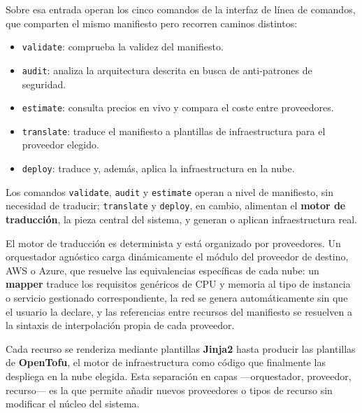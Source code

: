 Sobre esa entrada operan los cinco comandos de la interfaz de línea de comandos, que comparten el
mismo manifiesto pero recorren caminos distintos:

\begin{itemize}
    \item \texttt{validate}: comprueba la validez del manifiesto.
    \item \texttt{audit}: analiza la arquitectura descrita en busca de anti-patrones de seguridad.
    \item \texttt{estimate}: consulta precios en vivo y compara el coste entre proveedores.
    \item \texttt{translate}: traduce el manifiesto a plantillas de infraestructura para el proveedor elegido.
    \item \texttt{deploy}: traduce y, además, aplica la infraestructura en la nube.
\end{itemize}

Los comandos \texttt{validate}, \texttt{audit} y \texttt{estimate} operan a nivel de manifiesto,
sin necesidad de traducir; \texttt{translate} y \texttt{deploy}, en cambio, alimentan el
\textbf{motor de traducción}, la pieza central del sistema, y generan o aplican infraestructura real.

El motor de traducción es determinista y está organizado por proveedores. Un orquestador agnóstico
carga dinámicamente el módulo del proveedor de destino, AWS o Azure, que resuelve las
equivalencias específicas de cada nube: un \textbf{mapper} traduce los requisitos genéricos de
CPU y memoria al tipo de instancia o servicio gestionado correspondiente, la red se genera
automáticamente sin que el usuario la declare, y las referencias entre recursos del manifiesto se
resuelven a la sintaxis de interpolación propia de cada proveedor. 

Cada recurso se renderiza
mediante plantillas \textbf{Jinja2} hasta producir las plantillas de \textbf{OpenTofu}, el motor
de infraestructura como código que finalmente las despliega en la nube elegida. Esta separación
en capas —orquestador, proveedor, recurso— es la que permite añadir nuevos proveedores o tipos de
recurso sin modificar el núcleo del sistema.

